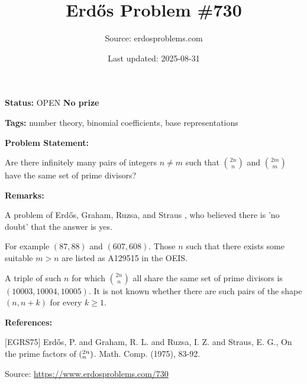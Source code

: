 \documentclass{article}
\title{Erd\H{o}s Problem \#730}
\date{Last updated: 2025-08-31}
\author{Source: erdosproblems.com}
\begin{document}
\maketitle

\noindent\textbf{Status:} OPEN \quad \textbf{No prize}

\noindent\textbf{Tags:} number theory, binomial coefficients, base representations

\medskip
\noindent\textbf{Problem Statement:}

Are there infinitely many pairs of integers $n\neq m$ such that $\binom{2n}{n}$ and $\binom{2m}{m}$ have the same set of prime divisors?

\bigskip
\noindent\textbf{Remarks:}

A problem of Erd\H{o}s, Graham, Ruzsa, and Straus \cite{EGRS75}, who believed there is 'no doubt' that the answer is yes. 

For example $(87,88)$ and $(607,608)$. Those $n$ such that there exists some suitable $m>n$ are listed as A129515 in the OEIS. 

A triple of such $n$ for which $\binom{2n}{n}$ all share the same set of prime divisors is $(10003,10004,10005)$. It is not known whether there are such pairs of the shape $(n,n+k)$ for every $k\geq 1$.

\bigskip
\noindent\textbf{References:}

[EGRS75] Erd\H{o}s, P. and Graham, R. L. and Ruzsa, I. Z. and Straus, E. G., On the prime factors of $(\sp{2n}\sb{n})$. Math. Comp. (1975), 83-92.

\bigskip
\noindent\small{Source: \url{https://www.erdosproblems.com/730}}
\end{document}
